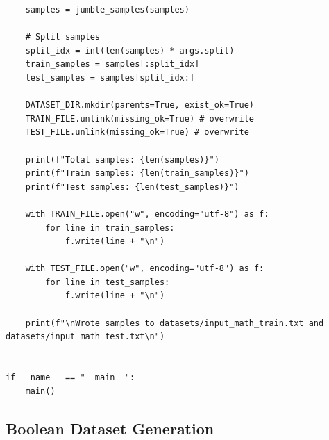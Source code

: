 \begin{verbatim}
    samples = jumble_samples(samples)

    # Split samples
    split_idx = int(len(samples) * args.split)
    train_samples = samples[:split_idx]
    test_samples = samples[split_idx:]

    DATASET_DIR.mkdir(parents=True, exist_ok=True)
    TRAIN_FILE.unlink(missing_ok=True) # overwrite
    TEST_FILE.unlink(missing_ok=True) # overwrite

    print(f"Total samples: {len(samples)}")
    print(f"Train samples: {len(train_samples)}")
    print(f"Test samples: {len(test_samples)}")

    with TRAIN_FILE.open("w", encoding="utf-8") as f:
        for line in train_samples:
            f.write(line + "\n")
            
    with TEST_FILE.open("w", encoding="utf-8") as f:
        for line in test_samples:
            f.write(line + "\n")

    print(f"\nWrote samples to datasets/input_math_train.txt and datasets/input_math_test.txt\n")


if __name__ == "__main__":
    main()
\end{verbatim}

\subsection{Boolean Dataset Generation}

